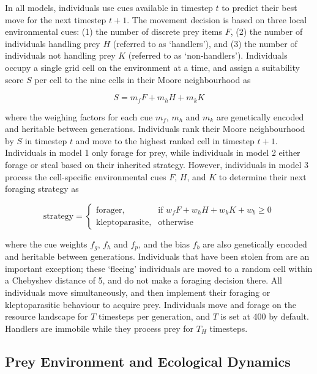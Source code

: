 \documentclass[11pt]{article}
\begin{document}
In all models, individuals use cues available in timestep $t$ to predict their best move for the next timestep $t+1$.
The movement decision is based on three local environmental cues: (1) the number of discrete prey items $F$, (2) the number of individuals handling  prey $H$ (referred to as `handlers'), and (3) the number of individuals not handling prey $K$ (referred to as `non-handlers').
Individuals occupy a single grid cell on the environment at a time, and assign a suitability score $S$ per cell to the nine cells in their Moore neighbourhood as
\begin{linenomath*}
    \begin{equation}
        S = m_fF + m_hH + m_kK
    \end{equation}
\end{linenomath*}
where the weighing factors for each cue $m_f$, $m_h$ and $m_k$ are genetically encoded and heritable between generations.
Individuals rank their Moore neighbourhood by $S$ in timestep $t$ and move to the highest ranked cell in timestep $t+1$.
Individuals in model 1 only forage for prey, while individuals in model 2 either forage or steal based on their inherited strategy.
However, individuals in model 3 process the cell-specific environmental cues $F$, $H$, and $K$ to determine their next foraging strategy as
\begin{linenomath*}
    \begin{equation}
        \text{strategy} = 
    \begin{cases}
        \text{forager},& \text{if } w_fF + w_hH + w_kK + w_b \geq 0\\
        \text{kleptoparasite},              & \text{otherwise}
    \end{cases}
    \end{equation}
\end{linenomath*}
where the cue weights $f_g$, $f_h$ and $f_p$, and the bias $f_b$ are also genetically encoded and heritable between generations.
Individuals that have been stolen from are an important exception; these `fleeing' individuals are moved to a random cell within a Chebyshev distance of 5, and do not make a foraging decision there.
All individuals move simultaneously, and then implement their foraging or kleptoparasitic behaviour to acquire prey.
Individuals move and forage on the resource landscape for $T$ timesteps per generation, and $T$ is set at 400 by default. 
Handlers are immobile while they process prey for $T_H$ timesteps.

\subsection{Prey Environment and Ecological Dynamics}
\end{document}
